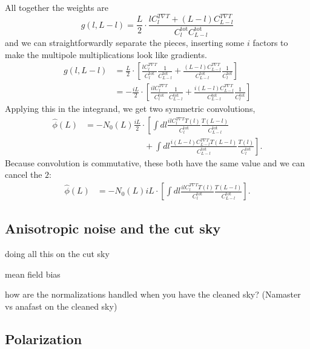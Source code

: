 All together the weights are
\begin{equation}
g(l,L-l) =  \frac{L}{2} \cdot \frac{ l C_{l}^{T\nabla T} + (L-l) C_{L-l}^{T\nabla T} }{C_l^\mathrm{tot}C_{L-l}^\mathrm{tot}}
\end{equation}
and we can straightforwardly separate the pieces, inserting some $i$ factors to make the multipole multiplications look like gradients.
\begin{align}
g(l,L-l) &=  \frac{L}{2} \cdot \left[ \frac{ l C_{l}^{T\nabla T} }{C_l^\mathrm{tot}}\frac{1}{C_{L-l}^\mathrm{tot}}  + \frac{ (L-l) C_{L-l}^{T\nabla T} }{C_{L-l}^\mathrm{tot}}\frac{1}{C_l^\mathrm{tot}}\right] \\ \nonumber
 &=  -\frac{iL}{2} \cdot \left[ \frac{ il C_{l}^{T\nabla T} }{C_l^\mathrm{tot}}\frac{1}{C_{L-l}^\mathrm{tot}}  + \frac{ i(L-l) C_{L-l}^{T\nabla T} }{C_{L-l}^\mathrm{tot}}\frac{1}{C_l^\mathrm{tot}}\right]
\end{align}
Applying this in the integrand, we get two symmetric convolutions,
\begin{align}
  \hat\phi(L) &= -N_0(L)\frac{iL}{2} \cdot  \left[ \int dl \frac{ il C_{l}^{T\nabla T} T(l)}{C_l^\mathrm{tot}}\frac{T(L-l)}{C_{L-l}^\mathrm{tot}}    \right. \nonumber \\
    & \qquad \qquad \qquad \quad + \left.\int dl \frac{ i(L-l) C_{L-l}^{T\nabla T}T(L-l) }{C_{L-l}^\mathrm{tot}}\frac{T(l)}{C_l^\mathrm{tot}} \right].
\end{align}
Because convolution is commutative, these both have the same value and we can cancel the $2$:
\begin{align}
  \hat\phi(L) &= -N_0(L){iL} \cdot  \left[ \int dl \frac{ il C_{l}^{T\nabla T} T(l)}{C_l^\mathrm{tot}}\frac{T(L-l)}{C_{L-l}^\mathrm{tot}}  \right].
\end{align}


\subsection{Anisotropic noise and the cut sky}

doing all this on the cut sky


mean field bias

how are the normalizations handled when you have the cleaned sky?  (Namaster vs anafast on the cleaned sky)


\subsection{Polarization}

